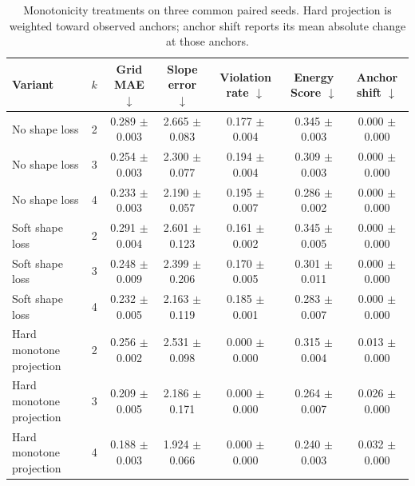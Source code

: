\begin{table}[t]
\caption{Monotonicity treatments on three common paired seeds. Hard projection is weighted toward observed anchors; anchor shift reports its mean absolute change at those anchors.}
\label{tab:monotonicity}
\centering\scriptsize\setlength{\tabcolsep}{4pt}
\begin{tabular}{lcccccc}
\toprule
Variant & $k$ & Grid MAE $\downarrow$ & Slope error $\downarrow$ & Violation rate $\downarrow$ & Energy Score $\downarrow$ & Anchor shift $\downarrow$ \\
\midrule
No shape loss & 2 & 0.289 $\pm$ 0.003 & 2.665 $\pm$ 0.083 & 0.177 $\pm$ 0.004 & 0.345 $\pm$ 0.003 & 0.000 $\pm$ 0.000 \\
No shape loss & 3 & 0.254 $\pm$ 0.003 & 2.300 $\pm$ 0.077 & 0.194 $\pm$ 0.004 & 0.309 $\pm$ 0.003 & 0.000 $\pm$ 0.000 \\
No shape loss & 4 & 0.233 $\pm$ 0.003 & 2.190 $\pm$ 0.057 & 0.195 $\pm$ 0.007 & 0.286 $\pm$ 0.002 & 0.000 $\pm$ 0.000 \\
Soft shape loss & 2 & 0.291 $\pm$ 0.004 & 2.601 $\pm$ 0.123 & 0.161 $\pm$ 0.002 & 0.345 $\pm$ 0.005 & 0.000 $\pm$ 0.000 \\
Soft shape loss & 3 & 0.248 $\pm$ 0.009 & 2.399 $\pm$ 0.206 & 0.170 $\pm$ 0.005 & 0.301 $\pm$ 0.011 & 0.000 $\pm$ 0.000 \\
Soft shape loss & 4 & 0.232 $\pm$ 0.005 & 2.163 $\pm$ 0.119 & 0.185 $\pm$ 0.001 & 0.283 $\pm$ 0.007 & 0.000 $\pm$ 0.000 \\
Hard monotone projection & 2 & 0.256 $\pm$ 0.002 & 2.531 $\pm$ 0.098 & 0.000 $\pm$ 0.000 & 0.315 $\pm$ 0.004 & 0.013 $\pm$ 0.000 \\
Hard monotone projection & 3 & 0.209 $\pm$ 0.005 & 2.186 $\pm$ 0.171 & 0.000 $\pm$ 0.000 & 0.264 $\pm$ 0.007 & 0.026 $\pm$ 0.000 \\
Hard monotone projection & 4 & 0.188 $\pm$ 0.003 & 1.924 $\pm$ 0.066 & 0.000 $\pm$ 0.000 & 0.240 $\pm$ 0.003 & 0.032 $\pm$ 0.000 \\
\bottomrule
\end{tabular}
\end{table}
